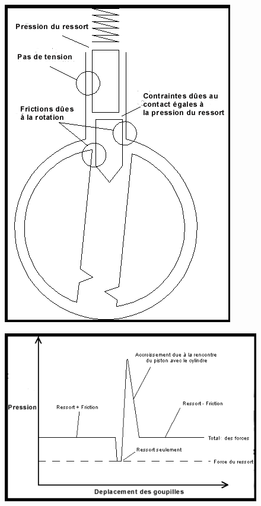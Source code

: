 \documentclass[a4paper,french,11pt,twoside]{report}
\begin{document}
\begin{figure}[h] \begin{center}
        \includegraphics[scale=0.6]{images/Image12}
        \caption{}
\end{center} \end{figure}

\begin{figure}[h] \begin{center}
        \includegraphics[scale=0.6]{images/Image13}
        \caption{}
\end{center} \end{figure}
\end{document}
